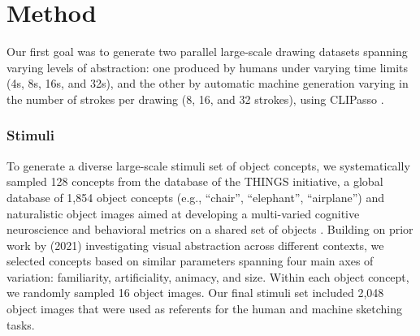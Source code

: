 \documentclass[10pt,letterpaper]{article}
\begin{document}
\section{Method}
Our first goal was to generate two parallel large-scale drawing datasets spanning varying levels of abstraction: one produced by humans under varying time limits (4s, 8s, 16s, and 32s), and the other by automatic machine generation varying in the number of strokes per drawing (8, 16, and 32 strokes), using CLIPasso \cite{vinker2022clipasso}.  



\subsubsection{Stimuli}
To generate a diverse large-scale stimuli set of object concepts, we systematically sampled 128 concepts from the database of the THINGS initiative, a global database of 1,854 object concepts (e.g., ``chair'', ``elephant'', ``airplane'') and naturalistic object images aimed at developing a multi-varied cognitive neuroscience and behavioral metrics on a shared set of objects \cite{hebart2019things}. 
Building on prior work by \citeauthor{yang2021visual} (2021) investigating visual abstraction across different contexts, we selected concepts based on similar parameters spanning four main axes of variation: familiarity, artificiality, animacy, and size. 
Within each object concept, we randomly sampled 16 object images. 
Our final stimuli set included 2,048 object images that were used as referents for the human and machine sketching tasks.
\end{document}

